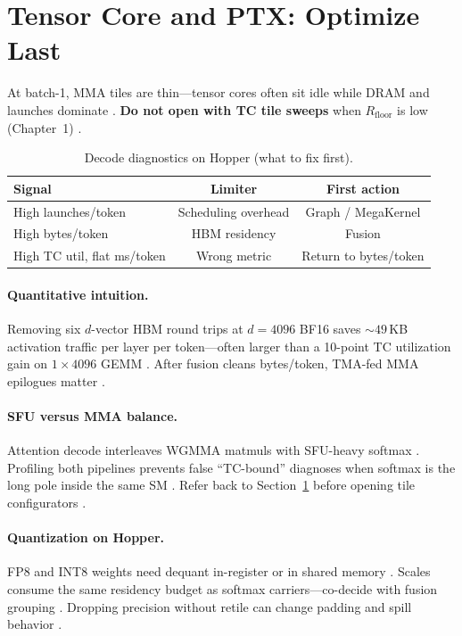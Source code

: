 \section{Tensor Core and PTX: Optimize Last}
\label{sec:ch04_tensor_core_bounds}

At batch-1, MMA tiles are thin---tensor cores often sit idle while DRAM and launches dominate \citep{memoryfloor2026,taxbreak2026,patel2025llminference}.
\textbf{Do not open with TC tile sweeps} when $R_{\mathrm{floor}}$ is low (Chapter~1) \citep{memoryfloor2026}.

\begin{table}[t]
\centering
\caption{Decode diagnostics on Hopper (what to fix first).}
\label{tab:tc_decode}
\begin{tabular}{lcc}
\toprule
\textbf{Signal} & \textbf{Limiter} & \textbf{First action} \\
\midrule
High launches/token & Scheduling overhead & Graph / MegaKernel \\
High bytes/token & HBM residency & Fusion \\
High TC util, flat ms/token & Wrong metric & Return to bytes/token \\
\bottomrule
\end{tabular}
\end{table}

\paragraph{Quantitative intuition.}
Removing six $d$-vector HBM round trips at $d{=}4096$ BF16 saves ${\sim}49$\,KB activation traffic per layer per token---often larger than a 10-point TC utilization gain on $1{\times}4096$ GEMM \citep{memoryfloor2026,taxbreak2026}.
After fusion cleans bytes/token, TMA-fed MMA epilogues matter \citep{semianalysis2024tma,dao2022flashattention}.

\paragraph{SFU versus MMA balance.}
Attention decode interleaves WGMMA matmuls with SFU-heavy softmax \citep{dao2022flashattention,nvidia2022hopper}.
Profiling both pipelines prevents false ``TC-bound'' diagnoses when softmax is the long pole inside the same SM \citep{patel2025llminference,liu2024deepseekv3}.
Refer back to Section~\ref{sec:ch04_tensor_core_bounds} before opening tile configurators \citep{memoryfloor2026}.

\paragraph{Quantization on Hopper.}
FP8 and INT8 weights need dequant in-register or in shared memory \citep{liu2024deepseekv3,patel2025llminference,nvidia2022hopper}.
Scales consume the same residency budget as softmax carriers---co-decide with fusion grouping \citep{memoryfloor2026,yirage2026}.
Dropping precision without retile can change padding and spill behavior \citep{chen2020compilerbasedhardw}.

